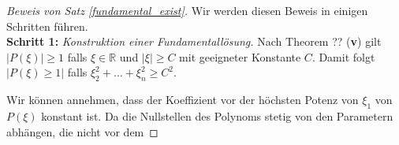 \begin{proof}[Beweis von Satz \ref{fundamental_exist}]
Wir werden diesen Beweis in einigen Schritten führen.
\vspace{1mm}\\
\textbf{Schritt 1:} \emph{Konstruktion einer Fundamentallösung.}
Nach Theorem ?? ({\bf v}) gilt $|P(\xi)|\ge 1$ falls $\xi\in \mathbb R$ und $|\xi|\ge C$ mit geeigneter Konstante $C$.  Damit folgt $|P(\xi)\ge 1|$ falls $\xi_2^2+ \ldots + \xi_n^2 \ge C^2$.  

Wir können annehmen, dass der Koeffizient vor der höchsten Potenz von $\xi_1$ von $P(\xi)$ konstant ist. Da die Nullstellen des Polynoms stetig von den Parametern abhängen, die nicht vor dem 
\end{proof}
